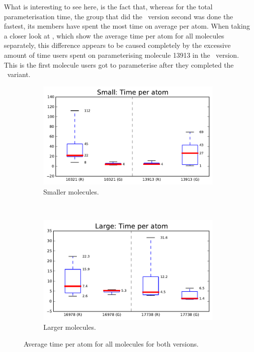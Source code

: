 What is interesting to see here, is the fact that, whereas for the total parameterisation time, the group that did the \IDb\ version second was done the fastest, its members have spent the most time on average per atom. When taking a closer look at , which show the average time per atom for all molecules separately, this difference appears to be caused completely by the excessive amount of time users spent on parameterising molecule 13913 in the \IDb\ version. This is the first molecule users got to parameterise after they completed the \IDa\ variant.

\begin{figure}[h!]
\centering
\begin{subfigure}[t]{0.48\textwidth}
\centering
\includegraphics[width=\textwidth]{img/graphs/1c_03.pdf}
\caption{Smaller molecules.}
\end{subfigure}%
~
\begin{subfigure}[t]{0.48\textwidth}
\centering
\includegraphics[width=\textwidth]{img/graphs/1d_03.pdf}
\caption{Larger molecules.}
\end{subfigure}
\caption{Average time per atom for all molecules for both versions.}
\end{figure}

